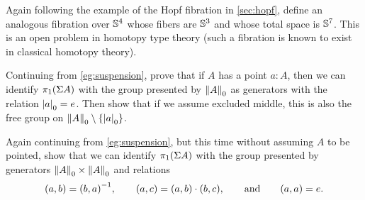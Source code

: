 \begin{ex}\label{ex:SuperHopf}
Again following the example of the Hopf fibration in \autoref{sec:hopf}, define an analogous fibration over $\Sn ^4$ whose fibers are $\Sn ^3$ and whose total space is $\Sn ^7$.  This is an open problem in homotopy type theory (such a fibration is known to exist in classical homotopy theory).
\end{ex}

\begin{ex}\label{ex:vksusppt}
  Continuing from \autoref{eg:suspension}, prove that if $A$ has a point $a:A$, then we can identify $\pi_1(\susp A)$ with the group presented by $\trunc0A$ as generators with the relation $\tproj0a = e$.
  Then show that if we assume excluded middle, this is also the free group on $\trunc0 A \setminus \{\tproj0 a \}$.
\end{ex}

\begin{ex}\label{ex:vksuspnopt}
  Again continuing from \autoref{eg:suspension}, but this time without assuming $A$ to be pointed, show that we can identify $\pi_1(\susp A)$ with the group presented by generators $\trunc0A \times \trunc0A$ and relations
  \begin{equation*}
    (a,b) = \opp{(b,a)},
    \qquad
    (a,c) = (a,b)\cdot (b,c),
    \qquad\text{and}\qquad
    (a,a) = e.
  \end{equation*}
\end{ex}


